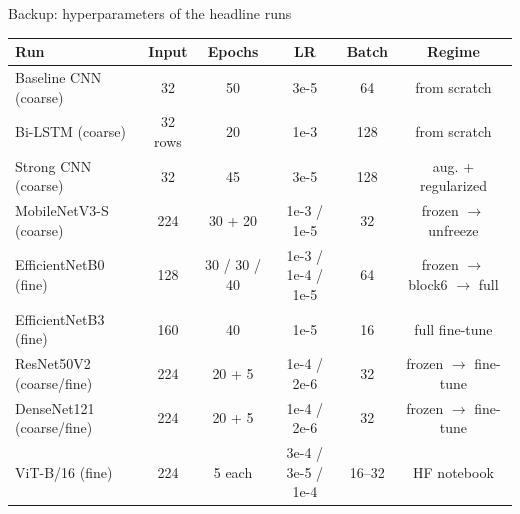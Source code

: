 \documentclass[aspectratio=169,11pt]{beamer}
\begin{document}
\begin{frame}{Backup: hyperparameters of the headline runs}
  \centering
  \footnotesize
  \renewcommand{\arraystretch}{1.08}    %
  \setlength{\tabcolsep}{5pt}
  \begin{tabular}{@{}lccccc@{}}
    \toprule
    \textbf{Run} & \textbf{Input} & \textbf{Epochs} & \textbf{LR} & \textbf{Batch} & \textbf{Regime} \\
    \midrule
    Baseline CNN (coarse)      & 32  & 50 & 3e-5 & 64 & from scratch \\
    Bi-LSTM (coarse)           & 32 rows & 20 & 1e-3 & 128 & from scratch \\
    Strong CNN (coarse)        & 32  & 45 & 3e-5 & 128 & aug. + regularized \\
    MobileNetV3-S (coarse)     & 224 & 30 + 20 & 1e-3 / 1e-5 & 32 & frozen $\to$ unfreeze \\
    EfficientNetB0 (fine)      & 128 & 30 / 30 / 40 & 1e-3 / 1e-4 / 1e-5 & 64 & frozen $\to$ block6 $\to$ full \\
    EfficientNetB3 (fine)      & 160 & 40 & 1e-5 & 16 & full fine-tune \\
    ResNet50V2 (coarse/fine)   & 224 & 20 + 5 & 1e-4 / 2e-6 & 32 & frozen $\to$ fine-tune \\
    DenseNet121 (coarse/fine)  & 224 & 20 + 5 & 1e-4 / 2e-6 & 32 & frozen $\to$ fine-tune \\
    ViT-B/16 (fine)            & 224 & 5 each & 3e-4 / 3e-5 / 1e-4 & 16--32 & HF notebook \\
    \bottomrule
  \end{tabular}


\end{frame}
\end{document}
